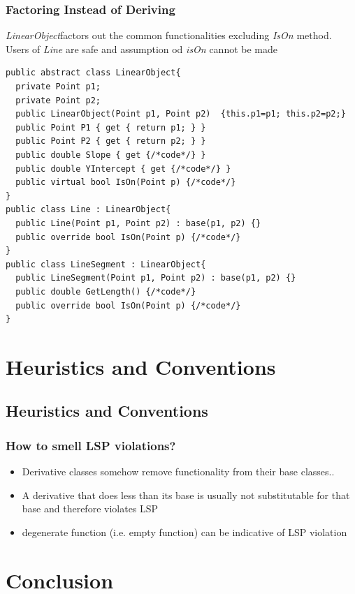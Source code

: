\documentclass{beamer}
\begin{document}
\begin{frame}[containsverbatim]
	\frametitle{Factoring Instead of Deriving}
	\textit{LinearObject}factors out the common functionalities excluding \textit{IsOn} method. Users of \textit{Line} are safe and assumption od \textit{isOn} cannot be made\\
	\begin{lstlisting}
public abstract class LinearObject{
  private Point p1;
  private Point p2;
  public LinearObject(Point p1, Point p2)  {this.p1=p1; this.p2=p2;}
  public Point P1 { get { return p1; } }
  public Point P2 { get { return p2; } }
  public double Slope { get {/*code*/} }
  public double YIntercept { get {/*code*/} }
  public virtual bool IsOn(Point p) {/*code*/}
}
public class Line : LinearObject{
  public Line(Point p1, Point p2) : base(p1, p2) {}
  public override bool IsOn(Point p) {/*code*/}
}
public class LineSegment : LinearObject{
  public LineSegment(Point p1, Point p2) : base(p1, p2) {}
  public double GetLength() {/*code*/}
  public override bool IsOn(Point p) {/*code*/}
}
	\end{lstlisting}
\end{frame}


\section{Heuristics and Conventions}
\subsection{Heuristics and Conventions}
\begin{frame}
  \frametitle{How to smell LSP violations?}
  \begin{itemize}
	\item<+-> Derivative classes somehow remove functionality from their base classes..
	\item<+-> A derivative that does less than its base is usually not substitutable for that base and therefore violates LSP
	\item<+-> degenerate function (i.e. empty function) can be indicative of LSP violation
   \end{itemize}
\end{frame}

\section{Conclusion}
\end{document}
